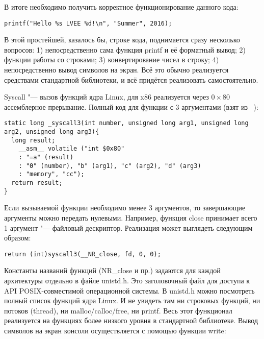\documentclass[10pt, a5paper]{article}
\begin{document}
В итоге необходимо получить корректное функционирование \linebreak данного кода:
\lstset{ %
anguage=C,                 %
basicstyle=\small\sffamily, %
breaklines=true,           %
breakatwhitespace=false, %
}
\begin{lstlisting}
printf("Hello %s LVEE %d!\n", "Summer", 2016);
\end{lstlisting}

В этой простейшей, казалось бы, строке кода, поднимается сразу несколько вопросов: 1) непосредственно сама функция printf и её форматный вывод; 2) функции работы со строками; 3) конвертирование чисел в строку; 4) непосредственно вывод символов на экран. Всё это обычно реализуется средствами стандартной библиотеки, и всё придётся реализовать самостоятельно.

Syscall "--- вызов функций ядра Linux, для x86 реализуется через $0\times80$ ассемблерное прерывание. Полный код для функции с 3 аргументами (взят из ~\cite{Khrabrov4}):

\begin{lstlisting}
static long _syscall3(int number, unsigned long arg1, unsigned long arg2, unsigned long arg3){
  long result;
    __asm__ volatile ("int $0x80"
    : "=a" (result)
    : "0" (number), "b" (arg1), "c" (arg2), "d" (arg3)
    : "memory", "cc");
  return result;
}
\end{lstlisting}

Если вызываемой функции необходимо менее 3 аргументов, то завершающие аргументы можно передать нулевыми. Например, \linebreak функция close принимает всего 1 аргумент "--- файловый дескриптор. Реализация может выглядеть следующим образом:

\begin{lstlisting}
return (int)syscall3(__NR_close, fd, 0, 0);
\end{lstlisting}

Константы названий функций (NR\_close и пр.) задаются для каждой архитектуры отдельно в файле unistd.h. Это заголовочный файл для доступа к API POSIX-совместимой операционной системы. В unistd.h можно посмотреть полный список функций ядра Linux. И не увидеть там ни строковых функций, ни потоков (thread), ни malloc/calloc/free, ни printf. Весь этот функционал реализуется на функциях более низкого уровня в стандартной библиотеке. Вывод символов на экран консоли осуществляется с помощью функции write:
\end{document}

